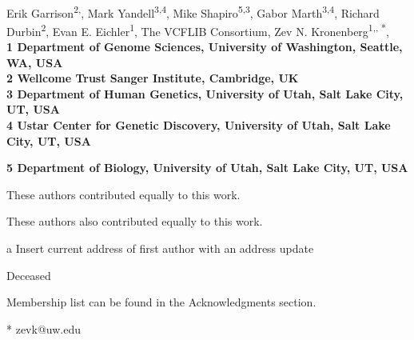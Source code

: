 \documentclass[10pt,letterpaper]{article}
\date{}
\begin{document}
\vspace*{0.35in}

\begin{flushleft}
{\Large
\textbf{}
}
\newline
\\

Erik Garrison\textsuperscript{2,\Yinyang},
Mark Yandell\textsuperscript{3,4},
Mike Shapiro\textsuperscript{5,3},
Gabor Marth\textsuperscript{3,4},
Richard Durbin\textsuperscript{2},
Evan E. Eichler\textsuperscript{1},
The VCFLIB Consortium\textsuperscript{\textpilcrow},
Zev N. Kronenberg\textsuperscript{1,\Yinyang, *},
\\
\bigskip
\bf{1} Department of Genome Sciences, University of Washington, Seattle, WA, USA
\\
\bf{2} Wellcome Trust Sanger Institute, Cambridge, UK
\\
\bf{3} Department of Human Genetics, University of Utah, Salt Lake City, UT, USA
\\
\bf{4} Ustar Center for Genetic Discovery, University of Utah, Salt Lake City, UT, USA

\bf{5} Department of Biology, University of Utah, Salt Lake City, UT, USA
\\
\bigskip

% 
%
\Yinyang These authors contributed equally to this work.

\ddag These authors also contributed equally to this work.

\textcurrency a Insert current address of first author with an address update

\dag Deceased

\textpilcrow Membership list can be found in the Acknowledgments section.

* zevk@uw.edu

\end{flushleft}
\end{document}
